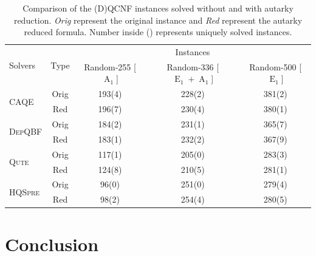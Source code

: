 \documentclass[runningheads]{llncs}
\DeclareMathOperator{\Aaut}{A}
\DeclareMathOperator{\Eaut}{E}
\newcommand{\caqe}{\textsc{CAQE}}
\newcommand{\depqbf}{\textsc{DepQBF}}
\newcommand{\qute}{\textsc{Qute}}
\newcommand{\hqspre}{\textsc{HQSpre}}
\begin{document}
\begin{table}
	\caption{Comparison of the (D)QCNF instances solved without and with autarky reduction. \emph{Orig} represent the original instance and \emph{Red} represent the autarky reduced formula. Number inside () represents uniquely solved instances.  }\label{tab:solver-eval}
	\begin{tabular}{l| c |c c c }

		\hline
		\multirow{2}{2.5cm}{Solvers} &  \multirow{2}{1cm}{Type} & \multicolumn{3}{c}{Instances} \\
		\cline{3-5}
		& & Random-255 [$\Aaut_1$] & Random-336 [$\Eaut_1+\Aaut_1$] & Random-500 [$\Eaut_1$] \\\hline


		\hline
		\multirow{2}{*}{\caqe} & Orig & 193(4) & 228(2) & 381(2) \\
		& Red & 196(7) & 230(4) & 380(1)\\\hline
		\multirow{2}{*}{\depqbf} & Orig & 184(2) & 231(1) & 365(7)\\
		& Red & 183(1)& 232(2)& 367(9)\\\hline
		\multirow{2}{*}{\qute} & Orig & 117(1) & 205(0) & 283(3)  \\
		& Red  & 124(8) & 210(5) & 281(1) \\\hline
		\multirow{2}{*}{\hqspre} & Orig & 96(0) &251(0) & 279(4) \\
		& Red  & 98(2)& 254(4) & 280(5) \\

		\hline
	\end{tabular}
\end{table}

\section{Conclusion}
\label{sec:conclusion}



\end{document}
